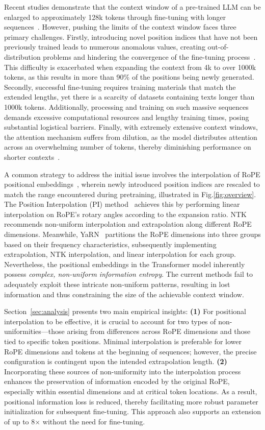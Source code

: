 Recent studies demonstrate that the context window of a pre-trained LLM can be enlarged to approximately 128k tokens through fine-tuning with longer sequences~\cite{longlora,pi,yarn,zhang2024soaring,liu2023scaling}. However, pushing the limits of the context window faces three primary challenges. Firstly, introducing novel position indices that have not been previously trained leads to numerous anomalous values, creating out-of-distribution problems and hindering the convergence of the fine-tuning process~\cite{pi}. This difficulty is exacerbated when expanding the context from 4k to over 1000k tokens, as this results in more than 90\% of the positions being newly generated. Secondly, successful fine-tuning requires training materials that match the extended lengths, yet there is a scarcity of datasets containing texts longer than 1000k tokens. Additionally, processing and training on such massive sequences demands excessive computational resources and lengthy training times, posing substantial logistical barriers. Finally, with extremely extensive context windows, the attention mechanism suffers from dilution, as the model distributes attention across an overwhelming number of tokens, thereby diminishing performance on shorter contexts~\cite{pi}.

A common strategy to address the initial issue involves the interpolation of RoPE positional embeddings~\cite{rope,pi}, wherein newly introduced position indices are rescaled to match the range encountered during pretraining, illustrated in Fig.\ref{fig:overview}. The Position Interpolation (PI) method~\cite{pi} achieves this by performing linear interpolation on RoPE's rotary angles according to the expansion ratio. NTK~\cite{ntk,dynamicntk} recommends non-uniform interpolation and extrapolation along different RoPE dimensions. Meanwhile, YaRN~\cite{yarn} partitions the RoPE dimensions into three groups based on their frequency characteristics, subsequently implementing extrapolation, NTK interpolation, and linear interpolation for each group. Nevertheless, the positional embeddings in the Transformer model inherently possess \emph{complex, non-uniform information entropy}. The current methods fail to adequately exploit these intricate non-uniform patterns, resulting in lost information and thus constraining the size of the achievable context window.

Section~\ref{sec:analysis} presents two main empirical insights: \textbf{(1)} For positional interpolation to be effective, it is crucial to account for two types of non-uniformities—those arising from differences across RoPE dimensions and those tied to specific token positions. Minimal interpolation is preferable for lower RoPE dimensions and tokens at the beginning of sequences; however, the precise configuration is contingent upon the intended extrapolation length. \textbf{(2)} Incorporating these sources of non-uniformity into the interpolation process enhances the preservation of information encoded by the original RoPE, especially within essential dimensions and at critical token locations. As a result, positional information loss is reduced, thereby facilitating more robust parameter initialization for subsequent fine-tuning. This approach also supports an extension of up to 8$\times$ without the need for fine-tuning.

